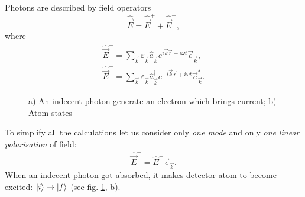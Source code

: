 Photons are described by field operators
\begin{equation}
	\hat{\vec{E}} = \hat{\vec{E}}^+ + \hat{\vec{E}}^-,
\end{equation}
where
\begin{eqnarray}
	\hat{\vec{E}}^+ = \sum_{\vec{k}} \varepsilon_{\vec{k}} \hat{a}_{\vec{k}} e^{i \vec{k} \vec{r} - i \omega t} \vec{e}_{\vec{k}}, \\
	\hat{\vec{E}}^- = \sum_{\vec{k}} \varepsilon_{\vec{k}} \hat{a}^{\dagger}_{\vec{k}} e^{-i \vec{k} \vec{r} + i \omega t} \vec{e}^*_{\vec{k}}.
\end{eqnarray}

\begin{figure}[h!]
	\begin{minipage}[h]{0.49\linewidth}
	\end{minipage}
	\hfill
	\begin{minipage}[h]{0.49\linewidth}
	\end{minipage}
	\caption{a) An indecent photon generate an electron which brings current; b) Atom states}
	\label{fig:dec}
\end{figure}


To simplify all the calculations let us consider only \textit{one mode} and only \textit{one linear polarisation} of field:
\begin{equation}
	\hat{\vec{E}}^+ = \hat{E}^+ \vec{e}_{\vec{k}}.
\end{equation}
When an indecent photon got absorbed, it makes detector atom to become excited: $\lvert i\rangle \to \lvert f\rangle$ (see fig. \ref{fig:dec}, b).


